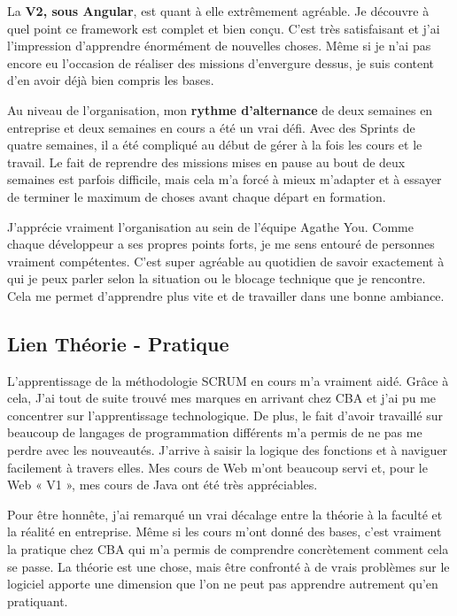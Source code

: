 \documentclass{article}
\begin{document}
La \textbf{V2, sous Angular}, est quant à elle extrêmement agréable. Je découvre à quel point ce framework est complet et bien conçu. C'est très satisfaisant et j'ai l'impression d'apprendre énormément de nouvelles choses. Même si je n'ai pas encore eu l'occasion de réaliser des missions d'envergure dessus, je suis content d'en avoir déjà bien compris les bases.

\newpage

Au niveau de l'organisation, mon \textbf{rythme d'alternance} de deux semaines en entreprise et deux semaines en cours a été un vrai défi. Avec des Sprints de quatre semaines, il a été compliqué au début de gérer à la fois les cours et le travail. Le fait de reprendre des missions mises en pause au bout de deux semaines est parfois difficile, mais cela m'a forcé à mieux m'adapter et à essayer de terminer le maximum de choses avant chaque départ en formation.

J'apprécie vraiment l'organisation au sein de l'équipe Agathe You. Comme chaque développeur a ses propres points forts, je me sens entouré de personnes vraiment compétentes. C'est super agréable au quotidien de savoir exactement à qui je peux parler selon la situation ou le blocage technique que je rencontre. Cela me permet d'apprendre plus vite et de travailler dans une bonne ambiance.

\subsection{Lien Théorie - Pratique}

L'apprentissage de la méthodologie SCRUM en cours m'a vraiment aidé. Grâce à cela, J'ai tout de suite trouvé mes marques en arrivant chez CBA et j'ai pu me concentrer sur l'apprentissage technologique. De plus, le fait d'avoir travaillé sur beaucoup de langages de programmation différents m'a permis de ne pas me perdre avec les nouveautés. J'arrive à saisir la logique des fonctions et à naviguer facilement à travers elles. Mes cours de Web m'ont beaucoup servi et, pour le Web « V1 », mes cours de Java ont été très appréciables.

Pour être honnête, j'ai remarqué un vrai décalage entre la théorie à la faculté et la réalité en entreprise. Même si les cours m'ont donné des bases, c'est vraiment la pratique chez CBA qui m'a permis de comprendre concrètement comment cela se passe. La théorie est une chose, mais être confronté à de vrais problèmes sur le logiciel apporte une dimension que l'on ne peut pas apprendre autrement qu'en pratiquant.
\end{document}
